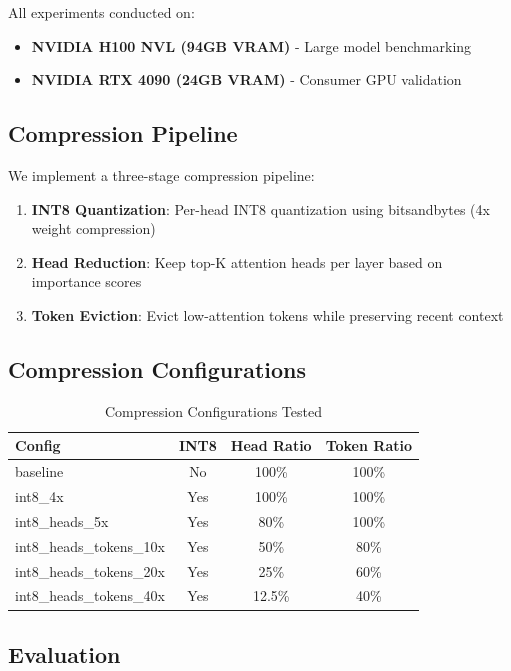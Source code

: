 \documentclass[11pt]{article}
\begin{document}
All experiments conducted on:
\begin{itemize}
    \item \textbf{NVIDIA H100 NVL (94GB VRAM)} - Large model benchmarking
    \item \textbf{NVIDIA RTX 4090 (24GB VRAM)} - Consumer GPU validation
\end{itemize}

\subsection{Compression Pipeline}

We implement a three-stage compression pipeline:

\begin{enumerate}
    \item \textbf{INT8 Quantization}: Per-head INT8 quantization using bitsandbytes (4x weight compression)
    \item \textbf{Head Reduction}: Keep top-K attention heads per layer based on importance scores
    \item \textbf{Token Eviction}: Evict low-attention tokens while preserving recent context
\end{enumerate}

\subsection{Compression Configurations}

\begin{table}[h]
\centering
\caption{Compression Configurations Tested}
\begin{tabular}{@{}lccc@{}}
\toprule
Config & INT8 & Head Ratio & Token Ratio \\
\midrule
baseline & No & 100\% & 100\% \\
int8\_4x & Yes & 100\% & 100\% \\
int8\_heads\_5x & Yes & 80\% & 100\% \\
int8\_heads\_tokens\_10x & Yes & 50\% & 80\% \\
int8\_heads\_tokens\_20x & Yes & 25\% & 60\% \\
int8\_heads\_tokens\_40x & Yes & 12.5\% & 40\% \\
\bottomrule
\end{tabular}
\end{table}

\subsection{Evaluation}
\end{document}
